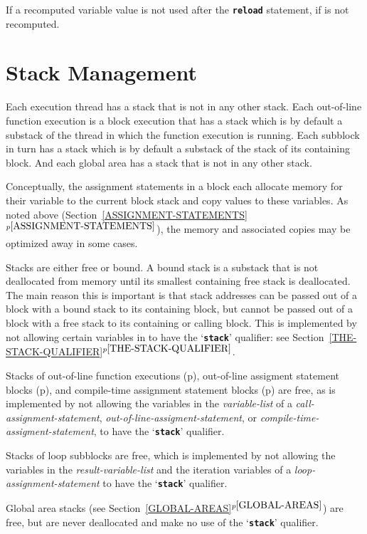 \documentclass[12pt]{article}
\newcommand{\TT}[1]{{\tt \bfseries #1}}
\newcommand{\itemref}[1]{\ref{#1}$^{p\pageref{#1}}$}
\newcommand{\pagref}[1]{p\pageref{#1}}
\begin{document}
If a recomputed variable value is not used after the \TT{reload} statement,
if is not recomputed.

\section{Stack Management}
\label{STACK-MANAGEMENT}

Each execution thread has a stack that is not in any other
stack.  Each out-of-line function
execution is a block execution that has a stack which is
by default a substack of the thread in which the function
execution is running.  Each subblock in turn has a stack
which is by default a substack of the stack of its containing block.
And each global area has a stack that is not in any other stack.

Conceptually, the assignment statements in a block each allocate memory for
their variable to the current block stack and copy values to these
variables.  As noted above (Section~\itemref{ASSIGNMENT-STATEMENTS}),
the memory and associated copies may be
optimized away in some cases.

Stacks are either free or bound.\label{FREE-STACK}
A bound stack is a substack that is
not deallocated from memory until its smallest containing free stack is
deallocated.  The main reason this is important is that stack addresses
can be passed out of a block with a bound stack to its containing block,
but cannot be passed out of a block with a free stack to its containing
or calling block.  This is implemented by not allowing certain
variables in to have the `\TT{stack}' qualifier: see
Section~\itemref{THE-STACK-QUALIFIER}.

Stacks of out-of-line function executions
(\pagref{OUT-OF-LINE-FUNCTIONS}),
out-of-line assigment statement blocks
(\pagref{OUT-OF-LINE-ASSIGNMENT-STATEMENTS}),
and
compile-time assignment statement blocks
(\pagref{COMPILE-TIME-ASSIGNMENT-STATEMENTS})
are free, as is implemented by
not allowing the variables in the {\em variable-list}
of a {\em call-assignment-statement},
{\em out-of-line-assigment-statement}, or
{\em compile-time-assigment-statement},
to have the `\TT{stack}' qualifier.

Stacks of loop subblocks are free,
which is implemented by not
allowing the variables in the {\em result-variable-list}
and the iteration variables
of a {\em loop-assignment-statement} to have the `\TT{stack}'
qualifier.

Global area stacks (see Section~\itemref{GLOBAL-AREAS}) are free,
but are never deallocated and make no use of the `\TT{stack}'
qualifier.
\end{document}
